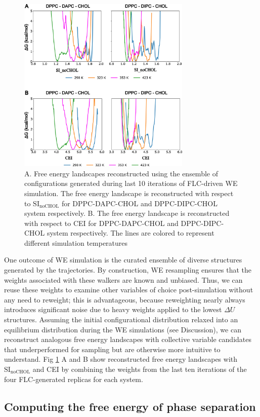 \documentclass{biophys-new}
\begin{document}
\begin{figure}[hbt!]
\centering
\includegraphics[width=3.25in]{Figures/Main/6/placeholder.jpg}
\caption{A. Free energy landscapes reconstructed using the ensemble of configurations generated during last 10 iterations of FLC-driven WE simulation. The free energy landscape is reconstructed with respect to $\text{SI}_{\text{noCHOL}}$ for DPPC-DAPC-CHOL and DPPC-DIPC-CHOL system respectively. B. The free energy landscape is reconstructed with respect to CEI for DPPC-DAPC-CHOL and DPPC-DIPC-CHOL system respectively. The lines are colored to represent different simulation temperatures}
\label{figs6:view}
\end{figure}

One outcome of WE simulation is the curated ensemble of diverse structures generated by the trajectories.
By construction, WE resampling ensures that the weights associated with these walkers are known and unbiased.
Thus, we can reuse these weights to examine other variables of choice post-simulation without any need to reweight; this is advantageous, because reweighting nearly always introduces significant noise due to heavy weights applied to the lowest $\Delta U$ structures.
Assuming the initial configurational distribution relaxed into an equilibrium distribution during the WE simulations (see Discussion), 
we can reconstruct analogous free energy landscapes with collective variable candidates that underperformed for sampling but are otherwise more intuitive to understand.
Fig \ref{figs6:view} A and B show reconstructed free energy landscapes with $\text{SI}_{\text{noCHOL}}$ and CEI by combining the weights from the last ten iterations of the four FLC-generated replicas for each system.

\subsection*{Computing the free energy of phase separation}
\end{document}
